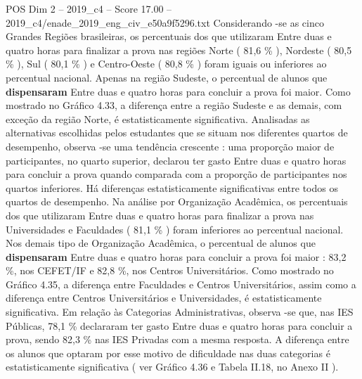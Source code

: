 \begin{textsample}{POS Dim 2 – 2019\_c4 – Score 17.00 – 2019\_c4/enade\_2019\_eng\_civ\_e50a9f5296.txt}
Considerando -se as cinco Grandes Regiões brasileiras, os percentuais dos que utilizaram Entre duas e quatro horas para finalizar a prova nas regiões Norte ( 81,6 \% ), Nordeste ( 80,5 \% ), Sul ( 80,1 \% ) e Centro-Oeste ( 80,8 \% ) foram iguais ou inferiores ao percentual nacional.
Apenas na região Sudeste, o percentual de alunos que \textbf{dispensaram} Entre duas e quatro horas para concluir a prova foi maior.
Como mostrado no Gráfico 4.33, a diferença entre a região Sudeste e as demais, com exceção da região Norte, é estatisticamente significativa.
Analisadas as alternativas escolhidas pelos estudantes que se situam nos diferentes quartos de desempenho, observa -se uma tendência crescente : uma proporção maior de participantes, no quarto superior, declarou ter gasto Entre duas e quatro horas para concluir a prova quando comparada com a proporção de participantes nos quartos inferiores.
Há diferenças estatisticamente significativas entre todos os quartos de desempenho.
Na análise por Organização Acadêmica, os percentuais dos que utilizaram Entre duas e quatro horas para finalizar a prova nas Universidades e Faculdades ( 81,1 \% ) foram inferiores ao percentual nacional.
Nos demais tipo de Organização Acadêmica, o percentual de alunos que \textbf{dispensaram} Entre duas e quatro horas para concluir a prova foi maior : 83,2 \%, nos CEFET/IF e 82,8 \%, nos Centros Universitários.
Como mostrado no Gráfico 4.35, a diferença entre Faculdades e Centros Universitários, assim como a diferença entre Centros Universitários e Universidades, é estatisticamente significativa.
Em relação às Categorias Administrativas, observa -se que, nas IES Públicas, 78,1 \% declararam ter gasto Entre duas e quatro horas para concluir a prova, sendo 82,3 \% nas IES Privadas com a mesma resposta.
A diferença entre os alunos que optaram por esse motivo de dificuldade nas duas categorias é estatisticamente significativa ( ver Gráfico 4.36 e Tabela II.18, no Anexo II ).

\end{textsample}
